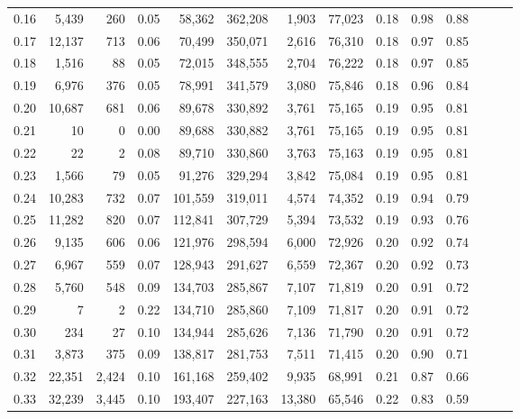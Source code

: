 \begin{tabular}{rrrrrrrrrrrrrr}
0.16 &   5,439 &    260 &  0.05 &   58,362 &  362,208 &   1,903 &  77,023 &  0.18 &  0.98 &      0.88 \\
0.17 &  12,137 &    713 &  0.06 &   70,499 &  350,071 &   2,616 &  76,310 &  0.18 &  0.97 &      0.85 \\
0.18 &   1,516 &     88 &  0.05 &   72,015 &  348,555 &   2,704 &  76,222 &  0.18 &  0.97 &      0.85 \\
0.19 &   6,976 &    376 &  0.05 &   78,991 &  341,579 &   3,080 &  75,846 &  0.18 &  0.96 &      0.84 \\
0.20 &  10,687 &    681 &  0.06 &   89,678 &  330,892 &   3,761 &  75,165 &  0.19 &  0.95 &      0.81 \\
0.21 &      10 &      0 &  0.00 &   89,688 &  330,882 &   3,761 &  75,165 &  0.19 &  0.95 &      0.81 \\
0.22 &      22 &      2 &  0.08 &   89,710 &  330,860 &   3,763 &  75,163 &  0.19 &  0.95 &      0.81 \\
0.23 &   1,566 &     79 &  0.05 &   91,276 &  329,294 &   3,842 &  75,084 &  0.19 &  0.95 &      0.81 \\
0.24 &  10,283 &    732 &  0.07 &  101,559 &  319,011 &   4,574 &  74,352 &  0.19 &  0.94 &      0.79 \\
0.25 &  11,282 &    820 &  0.07 &  112,841 &  307,729 &   5,394 &  73,532 &  0.19 &  0.93 &      0.76 \\
0.26 &   9,135 &    606 &  0.06 &  121,976 &  298,594 &   6,000 &  72,926 &  0.20 &  0.92 &      0.74 \\
0.27 &   6,967 &    559 &  0.07 &  128,943 &  291,627 &   6,559 &  72,367 &  0.20 &  0.92 &      0.73 \\
0.28 &   5,760 &    548 &  0.09 &  134,703 &  285,867 &   7,107 &  71,819 &  0.20 &  0.91 &      0.72 \\
0.29 &       7 &      2 &  0.22 &  134,710 &  285,860 &   7,109 &  71,817 &  0.20 &  0.91 &      0.72 \\
0.30 &     234 &     27 &  0.10 &  134,944 &  285,626 &   7,136 &  71,790 &  0.20 &  0.91 &      0.72 \\
0.31 &   3,873 &    375 &  0.09 &  138,817 &  281,753 &   7,511 &  71,415 &  0.20 &  0.90 &      0.71 \\
0.32 &  22,351 &  2,424 &  0.10 &  161,168 &  259,402 &   9,935 &  68,991 &  0.21 &  0.87 &      0.66 \\
0.33 &  32,239 &  3,445 &  0.10 &  193,407 &  227,163 &  13,380 &  65,546 &  0.22 &  0.83 &      0.59 \\

\end{tabular}
